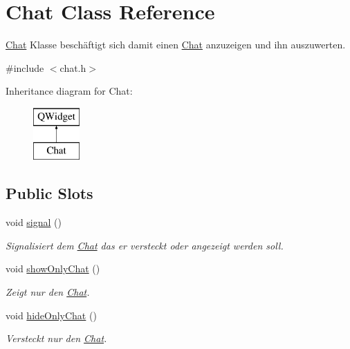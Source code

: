 \hypertarget{class_chat}{}\section{Chat Class Reference}
\label{class_chat}


\hyperlink{class_chat}{Chat} Klasse beschäftigt sich damit einen \hyperlink{class_chat}{Chat} anzuzeigen und ihn auszuwerten.  




{\ttfamily \#include $<$chat.\+h$>$}

Inheritance diagram for Chat\+:\begin{figure}[H]
\begin{center}
\leavevmode
\includegraphics[height=2.000000cm]{class_chat}
\end{center}
\end{figure}
\subsection*{Public Slots}
\begin{DoxyCompactItemize}
\item 
void \hyperlink{class_chat_a7b94bde4d4e53034b558a0aa0b8b76eb}{signal} ()
\begin{DoxyCompactList}\small\item\em Signalisiert dem \hyperlink{class_chat}{Chat} das er versteckt oder angezeigt werden soll. \end{DoxyCompactList}\item 
void \hyperlink{class_chat_aac15e09ec782dcee4a6f98492aa10633}{show\+Only\+Chat} ()
\begin{DoxyCompactList}\small\item\em Zeigt nur den \hyperlink{class_chat}{Chat}. \end{DoxyCompactList}\item 
void \hyperlink{class_chat_a7da9c4b3521928b4c85efce819a2e2d5}{hide\+Only\+Chat} ()
\begin{DoxyCompactList}\small\item\em Versteckt nur den \hyperlink{class_chat}{Chat}. \end{DoxyCompactList}\end{DoxyCompactItemize}
